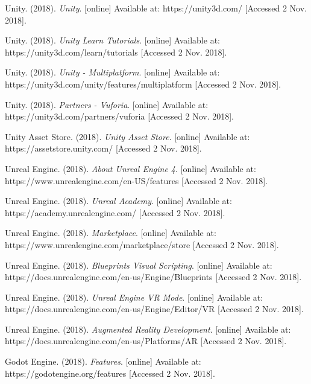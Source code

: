 \documentclass[letterpaper, 10pt, onecolumn, draftclsnofoot]{IEEEtran}
\begin{document}
\newpage
\begin{thebibliography}{1}
     Unity. (2018). \textit{Unity}. [online] Available at: https://unity3d.com/ [Accessed 2 Nov. 2018].
    
     Unity. (2018). \textit{Unity Learn Tutorials}. [online] Available at: https://unity3d.com/learn/tutorials [Accessed 2 Nov. 2018].
    
     Unity. (2018). \textit{Unity - Multiplatform}. [online] Available at: https://unity3d.com/unity/features/multiplatform [Accessed 2 Nov. 2018].
    
     Unity. (2018). \textit{Partners - Vuforia}. [online] Available at: https://unity3d.com/partners/vuforia [Accessed 2 Nov. 2018].
    
     Unity Asset Store. (2018). \textit{Unity Asset Store}. [online] Available at: https://assetstore.unity.com/ [Accessed 2 Nov. 2018].
    
     Unreal Engine. (2018). \textit{About Unreal Engine 4}. [online] Available at: https://www.unrealengine.com/en-US/features [Accessed 2 Nov. 2018].
    
     Unreal Engine. (2018). \textit{Unreal Academy}. [online] Available at: https://academy.unrealengine.com/ [Accessed 2 Nov. 2018].
    
     Unreal Engine. (2018). \textit{Marketplace}. [online] Available at: https://www.unrealengine.com/marketplace/store [Accessed 2 Nov. 2018].
    
     Unreal Engine. (2018). \textit{Blueprints Visual Scripting}. [online] Available at: https://docs.unrealengine.com/en-us/Engine/Blueprints [Accessed 2 Nov. 2018].
    
     Unreal Engine. (2018). \textit{Unreal Engine VR Mode}. [online] Available at: https://docs.unrealengine.com/en-us/Engine/Editor/VR [Accessed 2 Nov. 2018].
    
     Unreal Engine. (2018). \textit{Augmented Reality Development}. [online] Available at: https://docs.unrealengine.com/en-us/Platforms/AR [Accessed 2 Nov. 2018].
    
     Godot Engine. (2018). \textit{Features}. [online] Available at: https://godotengine.org/features [Accessed 2 Nov. 2018].
    

\end{thebibliography}
\end{document}
